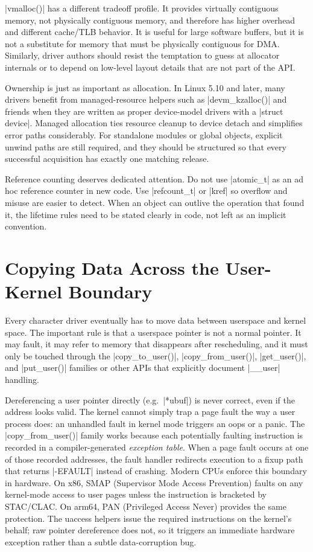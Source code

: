 \documentclass[10pt, oneside]{book}
\begin{document}
\cpp|vmalloc()| has a different tradeoff profile.
It provides virtually contiguous memory, not physically contiguous memory, and
therefore has higher overhead and different cache/TLB behavior.
It is useful for large software buffers, but it is not a substitute for memory
that must be physically contiguous for DMA.
Similarly, driver authors should resist the temptation to guess at allocator
internals or to depend on low-level layout details that are not part of the API.

Ownership is just as important as allocation.
In Linux 5.10 and later, many drivers benefit from managed-resource helpers such as
\cpp|devm_kzalloc()| and friends when they are written as proper device-model
drivers with a \cpp|struct device|.
Managed allocation ties resource cleanup to device detach and simplifies error
paths considerably.
For standalone modules or global objects, explicit unwind paths are still
required, and they should be structured so that every successful acquisition has
exactly one matching release.

Reference counting deserves dedicated attention.
Do not use \cpp|atomic_t| as an ad hoc reference counter in new code.
Use \cpp|refcount_t| or \cpp|kref| so overflow and misuse are easier to detect.
When an object can outlive the operation that found it, the lifetime rules need
to be stated clearly in code, not left as an implicit convention.

\section{Copying Data Across the User-Kernel Boundary}
\label{sec:user_kernel_boundary}
Every character driver eventually has to move data between userspace and kernel
space.
The important rule is that a userspace pointer is not a normal pointer.
It may fault, it may refer to memory that disappears after rescheduling, and it
must only be touched through the \cpp|copy_to_user()|, \cpp|copy_from_user()|,
\cpp|get_user()|, and \cpp|put_user()| families or other APIs that explicitly
document \cpp|__user| handling.

Dereferencing a user pointer directly (e.g.\ \cpp|*ubuf|) is never correct, even
if the address looks valid.
The kernel cannot simply trap a page fault the way a user process does: an
unhandled fault in kernel mode triggers an oops or a panic.
The \cpp|copy_from_user()| family works because each potentially faulting
instruction is recorded in a compiler-generated \emph{exception table}.
When a page fault occurs at one of those recorded addresses, the fault handler
redirects execution to a fixup path that returns \cpp|-EFAULT| instead of
crashing.
Modern CPUs enforce this boundary in hardware.
On x86, SMAP (Supervisor Mode Access Prevention) faults on any kernel-mode access to user pages unless the instruction is bracketed by STAC/CLAC.
On arm64, PAN (Privileged Access Never) provides the same protection.
The uaccess helpers issue the required instructions on the kernel's behalf; raw pointer dereference does not, so it triggers an immediate hardware exception rather than a subtle data-corruption bug.
\end{document}
